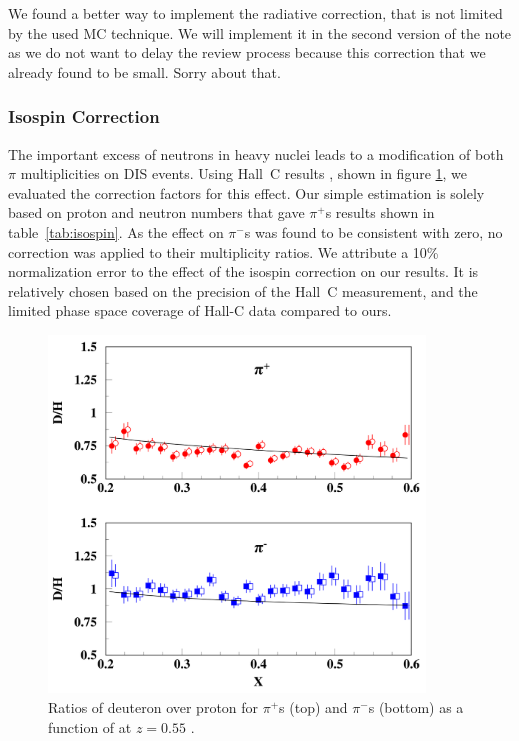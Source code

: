 {\color{red} We found a better way to implement the radiative correction,
that is not limited by the used MC technique. We will implement it in
the second version of the note as we do not want to delay the review process because this correction that we already found to be small. Sorry about that.}

\subsubsection{Isospin Correction}

The important excess of neutrons in heavy nuclei leads to a modification of both $\pi$ multiplicities on DIS events. Using Hall~C results 
\cite{Asaturyan:2011mq}, shown in figure \ref{fig:IsoSpin}, we evaluated the correction factors for this effect. Our simple estimation is solely based on 
proton and neutron numbers that gave $\pi^+$s results shown in table~\ref{tab:isospin}. As the effect on $\pi^-$s was found to be consistent with zero, no correction was applied to their multiplicity ratios. 
We attribute a 10\% normalization error to the effect of the isospin correction on our results. It is relatively chosen based on the precision of the Hall~C measurement, and the limited phase space coverage of Hall-C data compared to ours.

\begin{figure}[tbp]
\centering
\includegraphics[width=10cm] {chap5-fig/HallC-Isospin.png}
\caption {Ratios of deuteron over proton for $\pi^+$s (top) and $\pi^-$s (bottom)
as a function of \xb at $z=0.55$ \cite{Asaturyan:2011mq}.}
\label{fig:IsoSpin}
\end{figure}

